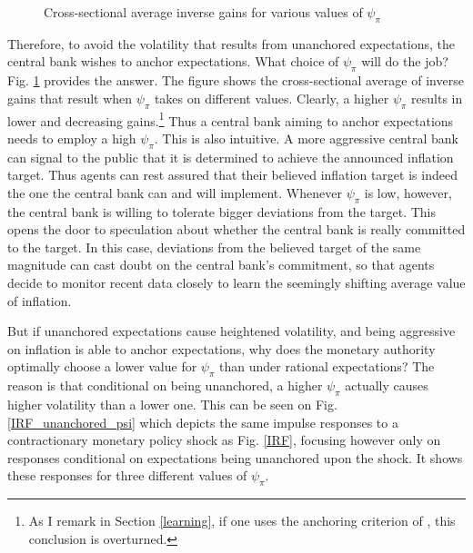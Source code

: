 \documentclass[11pt]{article}
\def \myFigPath {../../figures/}
\renewcommand{\[}{\begin{equation}}
\renewcommand{\]}{\end{equation}}
\def\mySmallerFigScale{0.18}
\begin{document}
\begin{figure}[h!]
\caption{Cross-sectional average inverse gains for various values of $\psi_{\pi}$}
\floatfoot{}
\label{anchor_psi}
\end{figure}
Therefore, to avoid the volatility that results from unanchored expectations, the central bank wishes to anchor expectations. What choice of $\psi_{\pi}$ will do the job? Fig. \ref{anchor_psi} provides the answer. The figure shows the cross-sectional average of inverse gains that result when $\psi_{\pi}$ takes on different values. Clearly, a higher $\psi_{\pi}$ results in lower and decreasing gains.\footnote{As I remark in Section \ref{learning}, if one uses the anchoring criterion of \cite{carvalho2019anchored}, this conclusion is overturned.} Thus a central bank aiming to anchor expectations needs to employ a high $\psi_{\pi}$. This is also intuitive. A more aggressive central bank can signal to the public that it is determined to achieve the announced inflation target. Thus agents can rest assured that their believed inflation target is indeed the one the central bank can and will implement. Whenever $\psi_{\pi}$ is low, however, the central bank is willing to tolerate bigger deviations from the target. This opens the door to speculation about whether the central bank is really committed to the target. In this case, deviations from the believed target of the same magnitude can cast doubt on the central bank's commitment, so that agents decide to monitor recent data closely to learn the seemingly shifting average value of inflation.

But if unanchored expectations cause heightened volatility, and being aggressive on inflation is able to anchor expectations, why does the monetary authority optimally choose a lower value for $\psi_{\pi}$ than under rational expectations? The reason is that conditional on being unanchored, a higher $\psi_{\pi}$ actually causes higher volatility than a lower one. This can be seen on Fig. \ref{IRF_unanchored_psi} which depicts the same impulse responses to a contractionary monetary policy shock as Fig. \ref{IRF}, focusing however only on responses conditional on expectations being unanchored upon the shock. It shows these responses for three different values of $\psi_{\pi}$.
\end{document}
